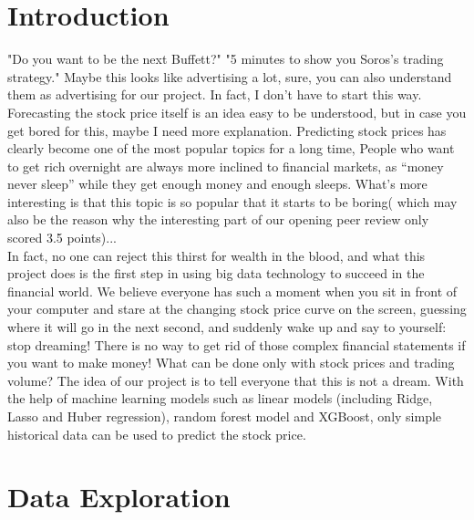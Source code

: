 \documentclass[fleqn,10pt]{SelfArx} %
\begin{document}
\section{Introduction}
\noindent
"Do you want to be the next Buffett?" "5 minutes to show you Soros's trading strategy." Maybe this looks like advertising a lot, sure, you can also understand them as advertising for our project. In fact, I don't have to start this way. Forecasting the stock price itself is an idea easy to be understood, but in case you get bored for this, maybe I need more explanation. Predicting stock prices has clearly become one of the most popular topics for a long time, People who want to get rich overnight are always more inclined to financial markets, as “money never sleep” while they get enough money and enough sleeps. What's more interesting is that this topic is so popular that it starts to be boring( which may also be the reason why the interesting part of our opening peer review only scored 3.5 points)...\\
\newline
\noindent
In fact, no one can reject this thirst for wealth in the blood, and what this project does is the first step in using big data technology to succeed in the financial world. We believe everyone has such a moment when you sit in front of your computer and stare at the changing stock price curve on the screen, guessing where it will go in the next second, and suddenly wake up and say to yourself: stop dreaming! There is no way to get rid of those complex financial statements if you want to make money! What can be done only with stock prices and trading volume? The idea of our project is to tell everyone that this is not a dream. With the help of machine learning models such as linear models (including Ridge, Lasso and Huber regression), random forest model and XGBoost, only simple historical data can be used to predict the stock price.
\section{Data Exploration} %
\end{document}

